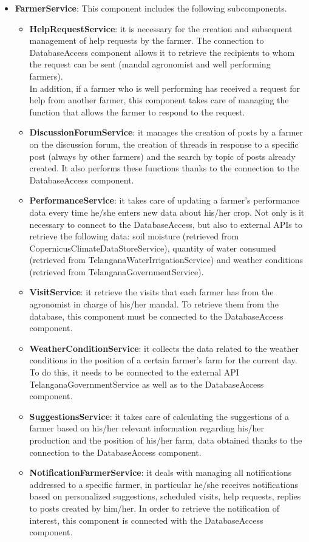 \begin{itemize}
\item \textbf{FarmerService}: This component includes the following subcomponents.

\begin{itemize}
    \item \textbf{HelpRequestService}: it is necessary for the creation and subsequent management of help requests by the farmer. The connection to DatabaseAccess component allows it to retrieve the recipients to whom the request can be sent (mandal agronomist and well performing farmers).\\
    In addition, if a farmer who is well performing has received a request for help from another farmer, this component takes care of managing the function that allows the farmer to respond to the request.
    \item \textbf{DiscussionForumService}: it manages the creation of posts by a farmer on the discussion forum, the creation of threads in response to a specific post (always by other farmers) and the search by topic of posts already created. It also performs these functions thanks to the connection to the DatabaseAccess component.
    \item \textbf{PerformanceService}: it takes care of updating a farmer's performance data every time he/she  enters new data about his/her crop. Not only is it necessary to connect to the DatabaseAccess, but also to external APIs to retrieve the following data: soil moisture (retrieved from CopernicusClimateDataStoreService), quantity of water consumed (retrieved from TelanganaWaterIrrigationService) and weather conditions (retrieved from TelanganaGovernmentService).
    \item \textbf{VisitService}: it retrieve the visits that each farmer has from the agronomist in charge of his/her mandal. To retrieve them from the database, this component must be connected to the DatabaseAccess component.
    \item \textbf{WeatherConditionService}: it collects the data related to the weather conditions in the position of a certain farmer's farm for the current day. To do this, it needs to be connected to the external API TelanganaGovernmentService as well as to the DatabaseAccess component.
    \item \textbf{SuggestionsService}: it takes care of calculating the suggestions of a farmer based on his/her relevant information regarding his/her production and the position of his/her farm, data obtained thanks to the connection to the DatabaseAccess component.
    \item \textbf{NotificationFarmerService}: it deals with managing all notifications addressed to a specific farmer, in particular he/she receives notifications based on personalized suggestions, scheduled visits, help requests, replies to posts created by him/her. In order to retrieve the notification of interest, this component is connected with the DatabaseAccess component.
\end{itemize}


\end{itemize}
